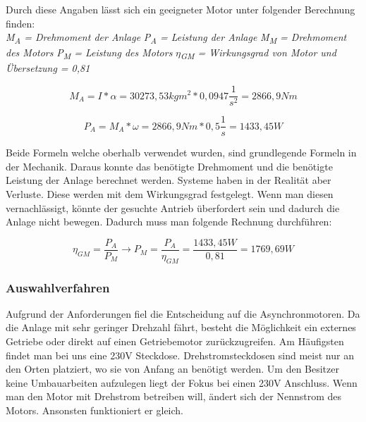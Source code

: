 Durch diese Angaben lässt sich ein geeigneter Motor unter folgender Berechnung finden:
\\
\textit{M\textsubscript{A} = Drehmoment der Anlage} \newline
\textit{P\textsubscript{A} = Leistung der Anlage} \newline
\textit{M\textsubscript{M} = Drehmoment des Motors} \newline
\textit{P\textsubscript{M} = Leistung des Motors} \newline
\textit{$\eta$\textsubscript{GM} = Wirkungsgrad von Motor und Übersetzung = 0,81}


\begin{center}
\begin{equation}
  \label{eq:2}
	M_{A} = I * \alpha = 30273,53kgm^2 * 0,0947 \dfrac{1}{s^2} = 2866,9 Nm
\end{equation} 
\end{center}


 
\begin{center}
\begin{equation}
  \label{eq:3}
	P_{A} = M_{A} * \omega = 2866,9 Nm * 0,5 \dfrac{1}{s} = 1433,45W
\end{equation} 
\end{center}

Beide Formeln welche oberhalb verwendet wurden, sind grundlegende Formeln in der Mechanik. Daraus konnte das benötigte Drehmoment und die benötigte Leistung der Anlage berechnet werden. Systeme haben in der Realität aber Verluste. Diese werden mit dem Wirkungsgrad festgelegt. Wenn man diesen vernachlässigt, könnte der gesuchte Antrieb überfordert sein und dadurch die Anlage nicht bewegen. Dadurch muss man folgende Rechnung durchführen:

\begin{center}
\begin{equation}
  \label{eq:4}
	\eta_{GM}= \frac{P_{A}}{P_{M}} \rightarrow P_{M} = \frac{P_{A}}{\eta_{GM}} = \frac{1433,45W}{0,81} = 1769,69W
\end{equation} 
\end{center}




\subsubsection{Auswahlverfahren}
\label{sec:auswahlverfahren}

Aufgrund der Anforderungen fiel die Entscheidung auf die Asynchronmotoren. Da die Anlage mit sehr geringer Drehzahl fährt, besteht die Möglichkeit ein externes Getriebe oder direkt auf einen Getriebemotor zurückzugreifen. 
Am Häufigsten findet man bei uns eine 230V Steckdose. Drehstromsteckdosen sind meist nur an den Orten platziert, wo sie von Anfang an benötigt werden. Um den Besitzer keine Umbauarbeiten aufzulegen liegt der Fokus bei einen 230V Anschluss. Wenn man den Motor mit Drehstrom betreiben will, ändert sich der Nennstrom des Motors. Ansonsten funktioniert er gleich.


